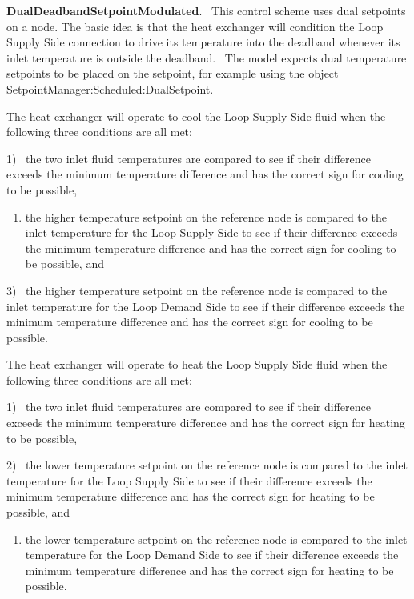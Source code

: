 \textbf{DualDeadbandSetpointModulated}.~ This control scheme uses dual setpoints on a node. The basic idea is that the heat exchanger will condition the Loop Supply Side connection to drive its temperature into the deadband whenever its inlet temperature is outside the deadband.~ The model expects dual temperature setpoints to be placed on the setpoint, for example using the object SetpointManager:Scheduled:DualSetpoint.

The heat exchanger will operate to cool the Loop Supply Side fluid when the following three conditions are all met:

1)~ the two inlet fluid temperatures are compared to see if their difference exceeds the minimum temperature difference and has the correct sign for cooling to be possible,

\begin{enumerate}
\def\labelenumi{\arabic{enumi})}
\setcounter{enumi}{1}
\tightlist
\item
  the higher temperature setpoint on the reference node is compared to the inlet temperature for the Loop Supply Side to see if their difference exceeds the minimum temperature difference and has the correct sign for cooling to be possible, and
\end{enumerate}

3)~ the higher temperature setpoint on the reference node is compared to the inlet temperature for the Loop Demand Side to see if their difference exceeds the minimum temperature difference and has the correct sign for cooling to be possible.

The heat exchanger will operate to heat the Loop Supply Side fluid when the following three conditions are all met:

1)~ the two inlet fluid temperatures are compared to see if their difference exceeds the minimum temperature difference and has the correct sign for heating to be possible,

2)~ the lower temperature setpoint on the reference node is compared to the inlet temperature for the Loop Supply Side to see if their difference exceeds the minimum temperature difference and has the correct sign for heating to be possible, and

\begin{enumerate}
\def\labelenumi{\arabic{enumi})}
\setcounter{enumi}{2}
\tightlist
\item
  the lower temperature setpoint on the reference node is compared to the inlet temperature for the Loop Demand Side to see if their difference exceeds the minimum temperature difference and has the correct sign for heating to be possible.
\end{enumerate}

